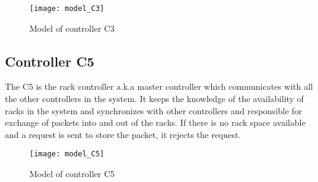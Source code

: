 \begin{figure}[ht]
\center
\texttt{[image: model\_C3]}
\caption{Model of controller C3}
\label{fig:controller_C3}
\end{figure}


\subsection*{Controller C5}
The C5 is the rack controller a.k.a master controller which communicates with all the other controllers in the system. It keeps the knowledge of the availability of racks in the system and synchronizes with other controllers and responsible for exchange of packets into and out of the racks. If there is no rack space available and a request is sent to store the packet, it rejects the request.

\begin{figure}[h]
\center
\texttt{[image: model\_C5]}
\caption{Model of controller C5}
\label{fig:controller_C5}
\end{figure}
